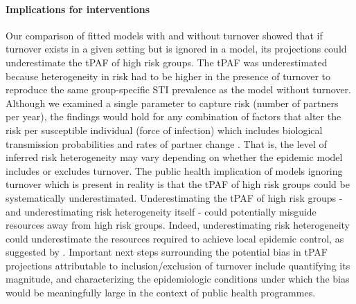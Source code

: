 \paragraph{Implications for interventions}
Our comparison of fitted models with and without turnover
showed that if turnover exists in a given setting
but is ignored in a model, its projections could 
underestimate 
the tPAF of high risk groups.		
The tPAF was underestimated because heterogeneity in risk
had to be higher in the presence of turnover
to reproduce the same group-specific STI prevalence as the model without turnover.
Although we examined a single parameter to capture risk
(number of partners per year),
the findings would hold for any combination of factors
that alter the risk per susceptible individual (force of infection)  
which includes
biological transmission probabilities and rates of partner change \citep{Anderson1991}.
That is, the level of inferred risk heterogeneity may vary depending on whether
the epidemic model includes or excludes turnover.
The public health implication of models ignoring turnover
which is present in reality is that
the tPAF of high risk groups could be systematically underestimated.
Underestimating the tPAF of high risk groups - and underestimating
risk heterogeneity itself - could potentially misguide resources away from high risk groups.
Indeed, underestimating risk heterogeneity could underestimate the resources 
required to achieve local epidemic control, as suggested by \citet{Henry2015}. %
Important next steps surrounding the potential bias in tPAF projections attributable to inclusion/exclusion
of turnover include quantifying its magnitude, 
and characterizing the epidemiologic conditions under which the bias
would be meaningfully large in the context of public health programmes.

